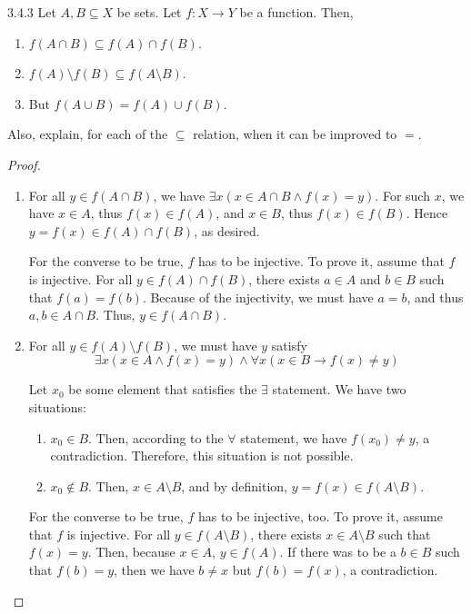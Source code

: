 \begin{exercise}{3.4.3}
	Let $A,B \subseteq X$ be sets. Let $f: X \to Y$ be a function. Then,
	\begin{enumerate}
		\item $f(A \cap B) \subseteq f(A) \cap f(B)$.
		\item $f(A) \setminus f(B) \subseteq f(A \setminus B)$.
		\item But $f(A \cup B) = f(A) \cup f(B)$.
	\end{enumerate}
	Also, explain, for each of the $\subseteq$ relation, when it can be improved to $=$.
\end{exercise}
\begin{proof}\leavevmode
	\begin{enumerate}
		\item 
		For all $y \in f(A \cap B)$, we have $\exists x(x \in A \cap B \wedge f(x) = y)$. For such $x$, we have $x \in A$, thus $f(x) \in f(A)$, and $x \in B$, thus $f(x) \in f(B)$. Hence $y = f(x) \in f(A) \cap f(B)$, as desired.
		
		For the converse to be true, $f$ has to be injective. To prove it, assume that $f$ is injective. For all $y \in f(A) \cap f(B)$, there exists $a \in A$ and $b \in B$ such that $f(a) = f(b)$. Because of the injectivity, we must have $a = b$, and thus $a,b \in A \cap B$. Thus, $y \in f(A \cap B)$.
		
		\item For all $y \in f(A) \setminus f(B)$, we must have $y$ satisfy
		\[
		\exists x(x \in A \wedge f(x) = y) \wedge \forall x(x \in B \to f(x) \ne y)
		\]
		
		Let $x_0$ be some element that satisfies the $\exists$ statement. We have two situations:
		\begin{enumerate}
			\item $x_0 \in B$. Then, according to the $\forall$ statement, we have $f(x_0) \ne y$, a contradiction. Therefore, this situation is not possible.
			\item $x_0 \notin B$. Then, $x \in A \setminus B$, and by definition, $y = f(x) \in f(A \setminus B)$.
		\end{enumerate}
	
		For the converse to be true, $f$ has to be injective, too. To prove it, assume that $f$ is injective. For all $y \in f(A \setminus B)$, there exists $x \in A \setminus B$ such that $f(x) = y$. Then, because $x \in A$, $y \in f(A)$. If there was to be a $b \in B$ such that $f(b) = y$, then we have $b \ne x$ but $f(b) = f(x)$, a contradiction.


\end{enumerate}
\end{proof}

